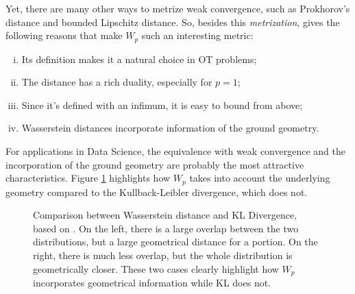 Yet, there are many other ways to metrize weak convergence, such as Prokhorov's distance and bounded
Lipschitz distance. So, besides this \textit{metrization}, \citet{villani2008optimal}
gives the following reasons that make $W_p$ such an interesting metric:
\begin{enumerate}[(i)]
  \item Its definition makes it a natural choice in OT problems;
  \item The distance has a rich duality, especially for $p=1$;
  \item Since it's defined with an infimum, it is easy to bound from above;
  \item Wasserstein distances incorporate information of the ground geometry.
\end{enumerate}

For applications in Data Science, the equivalence with weak convergence and the
incorporation of the ground geometry are probably the most attractive characteristics.
Figure \ref{fig:wl-kl}
highlights how $W_p$ takes into account the underlying geometry compared
to the Kullback-Leibler divergence, which does not.


\begin{figure}[H]
  \centering
  \def\svgscale{0.60}
  
	\caption{Comparison between Wasserstein distance and KL Divergence, based on \citet{montavon2016boltzmann}.
  On the left,
  there is a large overlap between the two distributions, but a large geometrical distance for a portion. On the right,
  there is much less overlap, but the whole distribution is geometrically closer. These two
  cases clearly highlight how $W_p$ incorporates geometrical information while KL does not.}
	\label{fig:wl-kl}
\end{figure}